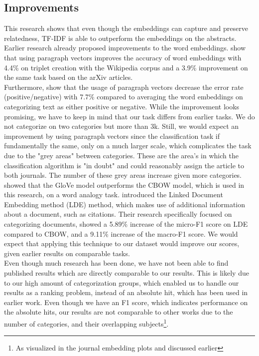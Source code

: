 \documentclass[runningheads]{llncs}
\begin{document}
\subsection{Improvements}
This research shows that even though the embeddings can capture and preserve relatedness, TF-IDF is able to outperform the embeddings on the abstracts. Earlier research already proposed improvements to the word embeddings. \citet{dai2015document} show that using paragraph vectors improves the accuracy of word embeddings with 4.4\% on triplet creation with the Wikipedia corpus and a 3.9\% improvement on the same task based on the arXiv articles.\\
Furthermore, \citet{le2014distributed} show that the usage of paragraph vectors decrease the error rate (positive/negative) with 7.7\% compared to averaging the word embeddings on categorizing text as either positive or negative. While the improvement looks promising, we have to keep in mind that our task differs from earlier tasks. We do not categorize on two categories but more than 3k. Still, we would expect an improvement by using paragraph vectors since the classification task if fundamentally the same, only on a much larger scale, which complicates the task due to the "grey areas"  between categories. These are the area's in which the classification algorithm is "in doubt" and could reasonably assign the article to both journals. The number of these grey areas increase given more categories. \citet{pennington2014glove} showed that the GloVe model outperforms the CBOW model, which is used in this research, on a word analogy task. \citet{wang2016linked} introduced the Linked Document Embedding method (LDE) method, which makes use of additional information about a document, such as citations. Their research specifically focused on categorizing documents, showed a 5.89\% increase of the micro-F1 score on LDE compared to CBOW, and a 9.11\% increase of the macro-F1 score. We would expect that applying this technique to our dataset would improve our scores, given earlier results on comparable tasks.\\
Even though much research has been done, we have not been able to find published results which are directly comparable to our results. This is likely due to our high amount of categorization groups, which enabled us to handle our results as a ranking problem, instead of an absolute hit, which has been used in earlier work\cite{wang2016linked}. Even though we have an F1 score, which indicates performance on the absolute hits, our results are not comparable to other works due to the number of categories, and their overlapping subjects\footnote{As visualized in the journal embedding plots and discussed earlier}.
\end{document}
